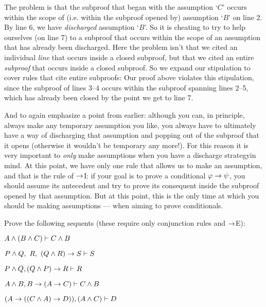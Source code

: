 The problem is that the subproof that began with the assumption `$C$' occurs within the scope of (i.e. within the subproof opened by) assumption `$B$' on line 2. By line 6, we have \emph{discharged} assumption `$B$'. So it is cheating to try to help ourselves (on line 7) to a subproof that occurs within the scope of an assumption that has already been discharged.  Here the problem isn't that we cited an individual \emph{line} that occurs inside a closed subproof, but that we cited an entire \emph{subproof} that occurs inside a closed subproof.  So we expand our stipulation to cover rules that cite entire subproofs:
Our proof above violates this stipulation, since the subproof of lines 3--4 occurs within the subproof spanning lines 2--5, which has already been closed by the point we get to line 7.


And to again emphasize a point from earlier: although you can, in principle, always make any temporary assumption you like, you always have to ultimately have a way of discharging that assumption and popping out of the subproof that it opens (otherwise it wouldn't be temporary any more!).    For this reason it is very important to \emph{only}  make assumptions when you have a discharge strategyin mind.  At this point, we have only one rule that allows us to make an assumption, and that is the rule of $\rightarrow$I: if your goal is to prove a conditional $\mathcal{\varphi} \rightarrow \mathcal{\psi}$, you should assume its antecedent \meta{\varphi} and try to prove its consequent \meta{\psi} inside the subproof opened by that assumption.  But at this point, this is the only time at which you should be making assumptions --- when aiming to prove conditionals.

\practiceproblems
\problempart
Prove the following sequents (these require only conjunction rules and $\rightarrow$E):

\begin{earg}
\item $A \wedge (B \wedge C) \vdash C \wedge B$
\item $P \wedge  Q, \ R, \ (Q \wedge  R) \rightarrow S \vdash S$
\item $P \wedge Q, (Q \wedge P) \rightarrow R \vdash R$
\item $A \wedge B, B \rightarrow (A \rightarrow C) \vdash C \wedge B$
 \item $(A\rightarrow ((C\wedge  A)\rightarrow D)), (A\wedge  C) \vdash D$
\end{earg}


